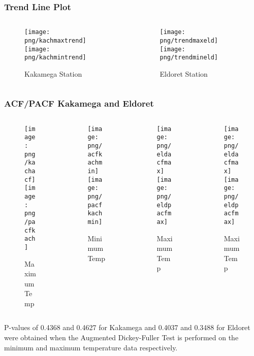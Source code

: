 \documentclass[]{beamer}
\begin{document}
\begin{frame}
\frametitle{Trend Line Plot}
\fontsize{8pt}{7.2}\selectfont
	\begin{columns}
		\begin{column}[c]{3cm}
			\begin{figure}
			\texttt{[image: png/kachmaxtrend]}
			\texttt{[image: png/kachmintrend]}
			\caption{Kakamega Station}
		\end{figure}
		\end{column}
		\begin{column}[c]{3cm}
			\begin{figure}
			\texttt{[image: png/trendmaxeld]}
			\texttt{[image: png/trendmineld]}
			\caption{Eldoret Station}
		\end{figure}
		\end{column}
	\end{columns}
\end{frame}

\begin{frame}
\frametitle{ACF/PACF Kakamega and Eldoret}
\fontsize{8pt}{7.2}\selectfont
\begin{columns}
\begin{column}[c]{3cm}
	\begin{figure}
\texttt{[image: png/kachacf]}
\texttt{[image: png/pacfkach]}
\caption{Maximum Temp}
\end{figure}
\end{column}
\begin{column}[c]{3cm}
	\begin{figure}
\texttt{[image: png/acfkachmin]}
\texttt{[image: png/pacfkachmin]}
\caption{Minimum Temp}
\end{figure}
\end{column}
\begin{column}[c]{3cm}
	\begin{figure}
		\texttt{[image: png/eldacfmax]}
		\texttt{[image: png/eldpacfmax]}
		\caption{Maximum Temp}
	\end{figure}
\end{column}
\begin{column}[c]{3cm}
	\begin{figure}
		\texttt{[image: png/eldacfmax]}
		\texttt{[image: png/eldpacfmax]}
		\caption{Maximum Temp}
	\end{figure}
\end{column}
\end{columns}
\fontsize{8pt}{7.2}\selectfont
P-values of 0.4368 and 0.4627 for Kakamega and 0.4037 and 0.3488 for Eldoret were obtained when the Augmented Dickey-Fuller Test is performed on the minimum and maximum temperature data respectively.
\end{frame}
\end{document}

